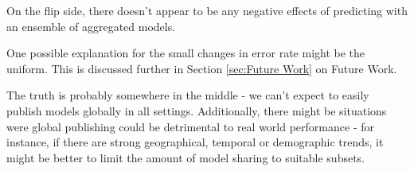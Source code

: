 On the flip side, there doesn't appear to be any negative effects of predicting with an ensemble of aggregated models. 

One possible explanation for the small changes in error rate might be the uniform. This is discussed further in Section \ref{sec:Future Work} on Future Work.  

The truth is probably somewhere in the middle - we can't expect to easily publish models globally in all settings. Additionally, there might be situations were global publishing could be detrimental to real world performance - for instance, if there are strong geographical, temporal or demographic trends, it might be better to limit the amount of model sharing to suitable subsets.


